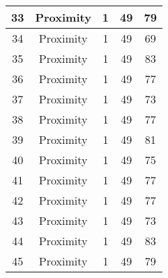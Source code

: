 \documentclass[results.tex]{subfiles}
\begin{document}
\begin{center}
\begin{tabular}{| c || c | c | c | c |}
            \hline
            33                      & Proximity                    & 1                      & 49                      & 79                   \\
            \hline
            34                      & Proximity                    & 1                      & 49                      & 69                   \\
            \hline
            35                      & Proximity                    & 1                      & 49                      & 83                   \\
            \hline
            36                      & Proximity                    & 1                      & 49                      & 77                   \\
            \hline
            37                      & Proximity                    & 1                      & 49                      & 73                   \\
            \hline
            38                      & Proximity                    & 1                      & 49                      & 77                   \\
            \hline
            39                      & Proximity                    & 1                      & 49                      & 81                   \\
            \hline
            40                      & Proximity                    & 1                      & 49                      & 75                   \\
            \hline
            41                      & Proximity                    & 1                      & 49                      & 77                   \\
            \hline
            42                      & Proximity                    & 1                      & 49                      & 77                   \\
            \hline
            43                      & Proximity                    & 1                      & 49                      & 73                   \\
            \hline
            44                      & Proximity                    & 1                      & 49                      & 83                   \\
            \hline
            45                      & Proximity                    & 1                      & 49                      & 79                   \\

\end{tabular}
\end{center}
\end{document}
